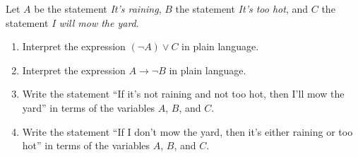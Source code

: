 \documentclass[11 pt]{article}
\begin{document}
\begin{description}
Let $A$ be the statement \emph{It's raining}, $B$ the statement \emph{It's too hot}, and $C$ the statement \emph{I will mow the yard}. 

\begin{enumerate}
    \item Interpret the expression $(\neg A) \vee C$ in plain language. 
    \item Interpret the expression $A \rightarrow \neg B$ in plain language. 
    \item Write the statement ``If it's not raining and not too hot, then I'll mow the yard'' in terms of the variables $A$, $B$, and $C$. 
    \item Write the statement ``If I don't mow the yard, then it's either raining or too hot'' in terms of the variables $A$, $B$, and $C$. 
\end{enumerate}


\end{description}
\end{document}
